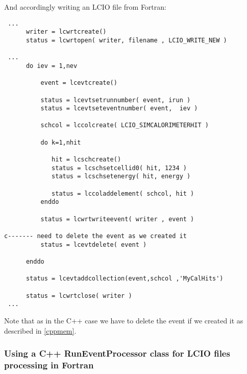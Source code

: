 And accordingly writing an LCIO file from Fortran:

\begin{verbatim}
 ...
      writer = lcwrtcreate()
      status = lcwrtopen( writer, filename , LCIO_WRITE_NEW )

 ... 
      do iev = 1,nev
          
          event = lcevtcreate()

          status = lcevtsetrunnumber( event, irun ) 
          status = lcevtseteventnumber( event,  iev ) 
 
          schcol = lccolcreate( LCIO_SIMCALORIMETERHIT )

          do k=1,nhit

             hit = lcschcreate() 
             status = lcschsetcellid0( hit, 1234 ) 
             status = lcschsetenergy( hit, energy )

             status = lccoladdelement( schcol, hit ) 
          enddo

          status = lcwrtwriteevent( writer , event )
          
c------- need to delete the event as we created it
          status = lcevtdelete( event )

      enddo

      status = lcevtaddcollection(event,schcol ,'MyCalHits') 

      status = lcwrtclose( writer ) 
 ...
\end{verbatim}

Note that as in the C++ case we have to delete the event if we created it as described in \ref{cppmem}. \\

\subsubsection{Using a C++ RunEventProcessor class for LCIO files processing in Fortran}

